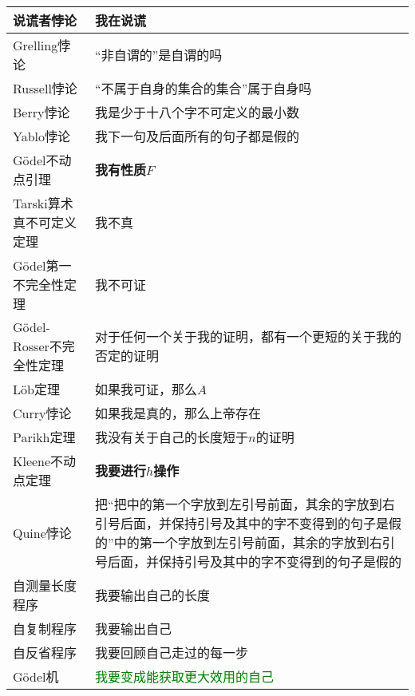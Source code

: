\documentclass[UTF8,11pt,colorlinks,compress,openany]{beamer}%
\begin{document}
\begin{frame}\frametitle{}\footnotesize
\begin{longtabu}{p{0.32\textwidth}|p{0.6\textwidth}}
\hline
说谎者悖论&\textbf{我在说谎}\\
\hline
Grelling悖论&“非自谓的”是自谓的吗\\
\hline
Russell悖论&“不属于自身的集合的集合”属于自身吗\\
\hline
Berry悖论&我是少于十八个字不可定义的最小数\\
\hline
Yablo悖论&我下一句及后面所有的句子都是假的\\
\hline
G\"odel不动点引理&\textbf{我有性质$F$}\\
\hline
Tarski算术真不可定义定理&我不真\\
\hline
G\"odel第一不完全性定理&我不可证\\
\hline
G\"odel-Rosser不完全性定理&对于任何一个关于我的证明，都有一个更短的关于我的否定的证明\\
\hline
L\"ob定理&如果我可证，那么$A$\\
\hline
Curry悖论&如果我是真的，那么上帝存在\\
\hline
Parikh定理&我没有关于自己的长度短于$n$的证明\\
\hline
Kleene不动点定理&\textbf{我要进行$h$操作}\\
\hline
Quine悖论&把“把中的第一个字放到左引号前面，其余的字放到右引号后面，并保持引号及其中的字不变得到的句子是假的”中的第一个字放到左引号前面，其余的字放到右引号后面，并保持引号及其中的字不变得到的句子是假的\\
\hline
自测量长度程序&我要输出自己的长度\\
\hline
自复制程序&我要输出自己\\
\hline
自反省程序&我要回顾自己走过的每一步\\
\hline
G\"odel机&\textcolor{green}{我要变成能获取更大效用的自己}\\
\hline
\end{longtabu}
\end{frame}
\end{document}
